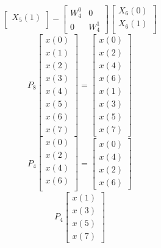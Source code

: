 \documentclass[journal,12pt,twocolumn]{IEEEtran}
\renewcommand\thesection{\arabic{section}}
\begin{document}
\begin{enumerate}[label=\arabic*.,ref=\thesection.\theenumi]
\begin{equation}
\begin{bmatrix}
X_{5}(1)\\ 
\end{bmatrix}
-
\begin{bmatrix}
W^{0}_{4} & 0\\
0 & W^{1}_{4}
\end{bmatrix}
\begin{bmatrix}
X_{6}(0) \\ 
X_{6}(1) \\ 
\end{bmatrix}
\end{equation}
\begin{equation}
P_{8}
\begin{bmatrix}
x(0) \\ 
x(1) \\ 
x(2) \\ 
x(3) \\ 
x(4) \\ 
x(5) \\
x(6) \\
x(7)
\end{bmatrix}
 = 
\begin{bmatrix}
x(0) \\ 
x(2) \\ 
x(4) \\ 
x(6) \\
x(1) \\ 
x(3) \\ 
x(5) \\
x(7)
\end{bmatrix}
\end{equation}
\begin{equation}
P_{4}
\begin{bmatrix}
x(0) \\ 
x(2) \\ 
x(4) \\ 
x(6) \\
\end{bmatrix}
 = 
\begin{bmatrix}
x(0) \\ 
x(4) \\ 
x(2) \\
x(6)
\end{bmatrix}
\end{equation}
\begin{equation}
P_{4}
\begin{bmatrix}
x(1) \\ 
x(3) \\ 
x(5) \\
x(7)
\end{bmatrix}

\end{equation}
\end{enumerate}
\end{document}
